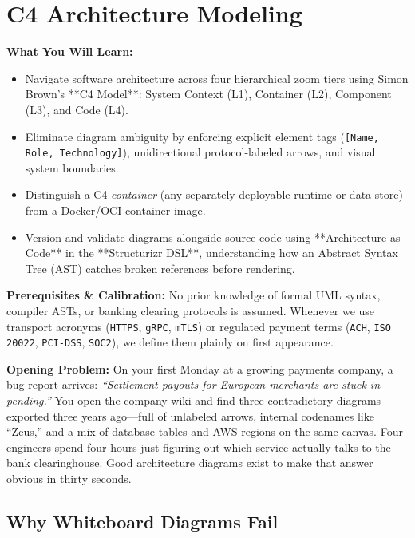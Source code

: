 \chapter{C4 Architecture Modeling}
\label{chap:c4}

\begin{chaptergoalsbox}
\textbf{What You Will Learn:}
\begin{itemize}[leftmargin=12pt]
  \item Navigate software architecture across four hierarchical zoom tiers using Simon Brown's **C4 Model**: System Context (L1), Container (L2), Component (L3), and Code (L4).
  \item Eliminate diagram ambiguity by enforcing explicit element tags (\texttt{[Name, Role, Technology]}), unidirectional protocol-labeled arrows, and visual system boundaries.
  \item Distinguish a C4 \emph{container} (any separately deployable runtime or data store) from a Docker/OCI container image.
  \item Version and validate diagrams alongside source code using **Architecture-as-Code** in the **Structurizr DSL**, understanding how an Abstract Syntax Tree (AST) catches broken references before rendering.
\end{itemize}

\textbf{Prerequisites \& Calibration:}
No prior knowledge of formal UML syntax, compiler ASTs, or banking clearing protocols is assumed. Whenever we use transport acronyms (\texttt{HTTPS}, \texttt{gRPC}, \texttt{mTLS}) or regulated payment terms (\texttt{ACH}, \texttt{ISO 20022}, \texttt{PCI-DSS}, \texttt{SOC2}), we define them plainly on first appearance.

\textbf{Opening Problem:}
On your first Monday at a growing payments company, a bug report arrives: \textit{``Settlement payouts for European merchants are stuck in pending.''} You open the company wiki and find three contradictory diagrams exported three years ago---full of unlabeled arrows, internal codenames like ``Zeus,'' and a mix of database tables and AWS regions on the same canvas. Four engineers spend four hours just figuring out which service actually talks to the bank clearinghouse. Good architecture diagrams exist to make that answer obvious in thirty seconds.
\end{chaptergoalsbox}

\section{Why Whiteboard Diagrams Fail}

